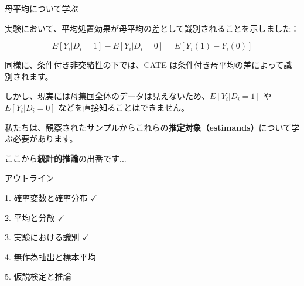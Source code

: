 \documentclass[11pt,handout]{beamer}
\newenvironment{wideitemize}{\itemize\addtolength{\itemsep}{10pt}}{\enditemize}
\begin{document}
\begin{frame}{母平均について学ぶ}
	
	\begin{wideitemize}
		\item 実験において、平均処置効果が母平均の差として識別されることを示しました：
		
		$$E[Y_i | D_i = 1] - E[Y_i |D_i =0] = E[Y_i(1)-Y_i(0)]$$

		\item
		同様に、条件付き非交絡性の下では、CATE は条件付き母平均の差によって識別されます。
		
		\pause
		\item
		しかし、現実には母集団全体のデータは見えないため、$E[Y_i | D_i = 1]$ や $E[Y_i | D_i = 0]$ などを直接知ることはできません。
		
		\pause
		\item
		私たちは、観察されたサンプルからこれらの\textbf{推定対象（estimands）}について学ぶ必要があります。
		
		\item
		ここから\textbf{統計的推論}の出番です...
	\end{wideitemize}
	
\end{frame}

\begin{frame}{アウトライン}
	
	\textcolor{red!75!green!50!blue!25!gray}{1. 確率変数と確率分布} $\checkmark$
	\vspace{0.8cm}
	
	\textcolor{red!75!green!50!blue!25!gray}{2. 平均と分散} $\checkmark$
	\vspace{0.8cm}
	
	\textcolor{red!75!green!50!blue!25!gray}{3. 実験における識別}  $\checkmark$
	\vspace{0.8cm}
	
	4. 無作為抽出と標本平均
	
	\vspace{0.8cm}
	\textcolor{red!75!green!50!blue!25!gray}{5. 仮説検定と推論}
	
\end{frame}
\end{document}
